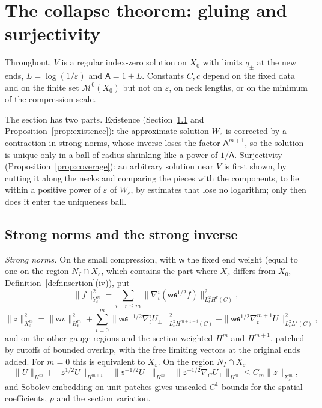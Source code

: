 \documentclass[11pt]{amsart}
\theoremstyle{definition}
\theoremstyle{remark}
\theoremstyle{plain}
\numberwithin{equation}{section}
\newcommand{\cM}{\mathcal{M}}
\newcommand{\eps}{\varepsilon}
\begin{document}
\section{The collapse theorem: gluing and surjectivity}\label{sec:collapse-coverage}

Throughout, $V$ is a regular index-zero solution on $X_0$ with limits
$q_\pm$ at the new ends, $L=\log(1/\eps)$ and $\mathsf A=1+L$. Constants $C,c$
depend on the fixed data and on the finite set $\cM^0(X_0)$ but not on
$\eps$, on neck lengths, or on the minimum of the compression scale.

The section has two parts. Existence (Section~\ref{subsec:charts} and Proposition~\ref{prop:existence}):
the approximate solution $W_\eps$ is corrected by a contraction in strong norms, whose inverse
loses the factor $\mathsf A^{m+1}$, so the solution is unique only in a ball of radius
shrinking like a power of $1/\mathsf A$. Surjectivity (Proposition~\ref{prop:coverage}): an
arbitrary solution near $V$ is first shown, by cutting it along the necks and comparing the
pieces with the components, to lie within a positive power of $\eps$ of $W_\eps$, by estimates
that lose no logarithm; only then does it enter the uniqueness ball.

\subsection{Strong norms and the strong inverse}\label{subsec:charts}

\emph{Strong norms.} On the small compression, with $\mathsf w$ the fixed end weight
(equal to one on the region $N_I\cap X_\eps$, which contains the part where $X_\eps$ differs from $X_0$, Definition~\ref{def:insertion}(iv)), put
\[
\|f\|_{Y^m_\eps}^2=\sum_{i+r\le m}\|\nabla^i_t(\mathsf w{\mathfrak s}^{1/2}f)\|^2_{L^2_tH^r(C)},
\]
\[
\|z\|_{X^m_\eps}^2=\|\mathsf wv\|^2_{H^m_t}+\sum_{i=0}^m\|\mathsf w{\mathfrak s}^{-1/2}\nabla^i_tU_\perp\|^2_{L^2_t
H^{m+1-i}(C)}+\|\mathsf w{\mathfrak s}^{1/2}\nabla_t^{m+1}U\|^2_{L^2_tL^2(C)},
\]
and on the other gauge regions and the section weighted $H^m$ and $H^{m+1}$,
patched by cutoffs of bounded overlap, with the free limiting vectors at the
original ends added. For $m=0$ this is equivalent to $X_\eps$. On the region
$N_I\cap X_\eps$
\begin{equation}\label{eq:strong-control}
\|U\|_{H^m}+\|{\mathfrak s}^{1/2}U\|_{H^{m+1}}+\|{\mathfrak s}^{-1/2}U_\perp\|_{H^m}+\|{\mathfrak s}^{-1/2}\nabla_CU_\perp\|_{H^m}
\le C_m\|z\|_{X^m_\eps},
\end{equation}
and Sobolev embedding on unit patches gives unscaled $C^1$ bounds for the
spatial coefficients, $p$ and the section variation.
\end{document}
